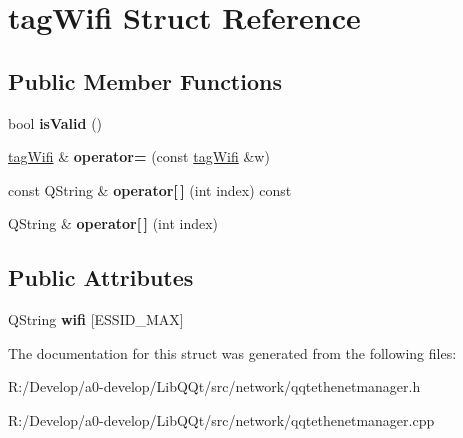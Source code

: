 \hypertarget{structtag_wifi}{}\section{tag\+Wifi Struct Reference}
\label{structtag_wifi}
\subsection*{Public Member Functions}
\begin{DoxyCompactItemize}
\item 
\mbox{\label{structtag_wifi_a2038da37d88bca4841aa426ad792648a}} 
bool {\bfseries is\+Valid} ()
\item 
\mbox{\label{structtag_wifi_a4a1b9d6f88d1045cd6009f3834869287}} 
\mbox{\hyperlink{structtag_wifi}{tag\+Wifi}} \& {\bfseries operator=} (const \mbox{\hyperlink{structtag_wifi}{tag\+Wifi}} \&w)
\item 
\mbox{\label{structtag_wifi_a6fd67150120e0f70a0dee5ef53767a9a}} 
const Q\+String \& {\bfseries operator\mbox{[}$\,$\mbox{]}} (int index) const
\item 
\mbox{\label{structtag_wifi_a8676ded9aba4f02194a426a6756ed1da}} 
Q\+String \& {\bfseries operator\mbox{[}$\,$\mbox{]}} (int index)
\end{DoxyCompactItemize}
\subsection*{Public Attributes}
\begin{DoxyCompactItemize}
\item 
\mbox{\label{structtag_wifi_acb1328cbe7fa1d568186116a29e99d1f}} 
Q\+String {\bfseries wifi} \mbox{[}E\+S\+S\+I\+D\+\_\+\+M\+AX\mbox{]}
\end{DoxyCompactItemize}


The documentation for this struct was generated from the following files\+:\begin{DoxyCompactItemize}
\item 
R\+:/\+Develop/a0-\/develop/\+Lib\+Q\+Qt/src/network/qqtethenetmanager.\+h\item 
R\+:/\+Develop/a0-\/develop/\+Lib\+Q\+Qt/src/network/qqtethenetmanager.\+cpp\end{DoxyCompactItemize}
